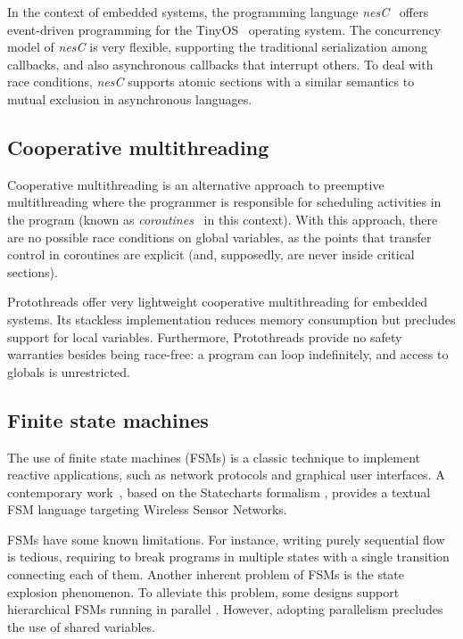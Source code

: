 \documentclass[pdftex,12pt,a4paper]{article}
\newcommand{\nesc}{\emph{nesC}}
\begin{document}
In the context of embedded systems, the programming language 
\nesc{}~\cite{wsn.nesc} offers event-driven programming for the 
TinyOS~\cite{wsn.tos} operating system.
The concurrency model of \nesc{} is very flexible, supporting the traditional 
serialization among callbacks, and also asynchronous callbacks that interrupt 
others.
To deal with race conditions, \nesc{} supports atomic sections with a similar 
semantics to mutual exclusion in asynchronous languages.

\subsection{Cooperative multithreading}

Cooperative multithreading is an alternative approach to preemptive 
multithreading where the programmer is responsible for scheduling activities in 
the program (known as \emph{coroutines}~\cite{lua.coroutines} in this context).
With this approach, there are no possible race conditions on global variables, 
as the points that transfer control in coroutines are explicit (and, 
supposedly, are never inside critical sections).

Protothreads \cite{wsn.protothreads} offer very lightweight cooperative 
multithreading for embedded systems.
Its stackless implementation reduces memory consumption but precludes support 
for local variables.
Furthermore, Protothreads provide no safety warranties besides being race-free: 
a program can loop indefinitely, and access to globals is unrestricted.

\subsection{Finite state machines}

The use of finite state machines (FSMs) is a classic technique to implement
reactive applications, such as network protocols and graphical user interfaces.
A contemporary work~\cite{wsn.osm}, based on the Statecharts formalism 
\cite{statecharts.visual}, provides a textual FSM language targeting Wireless 
Sensor Networks.

FSMs have some known limitations.
For instance, writing purely sequential flow is tedious, requiring to break 
programs in multiple states with a single transition connecting each of them.  
Another inherent problem of FSMs is the state explosion phenomenon.
To alleviate this problem, some designs support hierarchical FSMs running in 
parallel \cite{wsn.osm}.
However, adopting parallelism precludes the use of shared variables.
\end{document}
